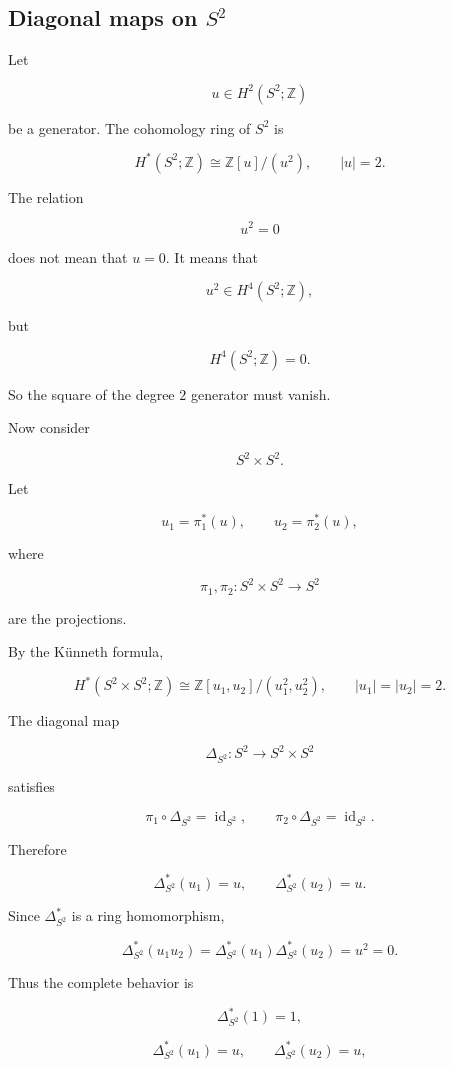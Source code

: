 \documentclass[12pt,a4paper]{article}
\theoremstyle{notespace}
\begin{document}
\subsection{Diagonal maps on \(S^2\)}

Let

\[
u\in H^2(S^2;\mathbb Z)
\]

be a generator. The cohomology ring of \(S^2\) is

\[
H^*(S^2;\mathbb Z)
\cong
\mathbb Z[u]/(u^2),
\qquad
|u|=2.
\]

The relation

\[
u^2=0
\]

does not mean that \(u=0\). It means that

\[
u^2\in H^4(S^2;\mathbb Z),
\]

but

\[
H^4(S^2;\mathbb Z)=0.
\]

So the square of the degree \(2\) generator must vanish.

Now consider

\[
S^2\times S^2.
\]

Let

\[
u_1=\pi_1^*(u),
\qquad
u_2=\pi_2^*(u),
\]

where

\[
\pi_1,\pi_2:S^2\times S^2\to S^2
\]

are the projections.

By the Künneth formula,

\[
H^*(S^2\times S^2;\mathbb Z)
\cong
\mathbb Z[u_1,u_2]/(u_1^2,u_2^2),
\qquad
|u_1|=|u_2|=2.
\]

The diagonal map

\[
\Delta_{S^2}:S^2\to S^2\times S^2
\]

satisfies

\[
\pi_1\circ\Delta_{S^2}=\operatorname{id}_{S^2},
\qquad
\pi_2\circ\Delta_{S^2}=\operatorname{id}_{S^2}.
\]

Therefore

\[
\Delta_{S^2}^*(u_1)=u,
\qquad
\Delta_{S^2}^*(u_2)=u.
\]

Since \(\Delta_{S^2}^*\) is a ring homomorphism,

\[
\Delta_{S^2}^*(u_1u_2)
=
\Delta_{S^2}^*(u_1)\Delta_{S^2}^*(u_2)
=
u^2
=
0.
\]

Thus the complete behavior is

\[
\boxed{
	\Delta_{S^2}^*(1)=1,
}
\]

\[
\boxed{
	\Delta_{S^2}^*(u_1)=u,
	\qquad
	\Delta_{S^2}^*(u_2)=u,
}
\]
\end{document}
